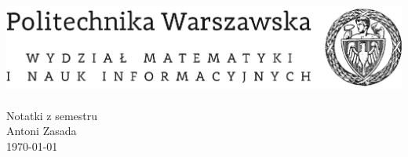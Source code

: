 \begin{titlepage}
    \begin{center}
        \includegraphics[scale=1]{logo_mini.png}
            \vspace{0.1\textheight}
        \\\Huge\textsf{\lecturename{}\\
            \medskip
        \large Notatki z semestru \semestername\\}
            \vspace{0.35\textheight}
        \Large Antoni Zasada\\
        \medskip
    \normalsize \today
    \end{center}
\end{titlepage}
